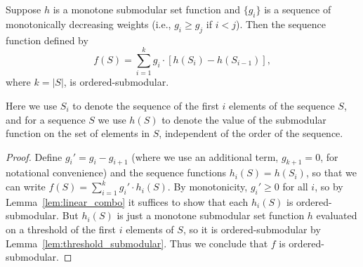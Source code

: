 \begin{lem} \label{lem:weighted_submodular}
Suppose $h$ is a monotone submodular set function and $\{g_i\}$ is a sequence of monotonically decreasing weights (i.e., $g_i \ge g_j$ if $i < j$). Then the sequence function defined by
$$f(S) = \sum_{i=1}^k g_i \cdot [ h(S_i) - h(S_{i-1}) ],$$ 
where $k = |S|$, is ordered-submodular. 
\end{lem}
Here we use $S_i$ to denote the sequence of the first $i$ elements of the sequence $S$, and for a sequence $S$ we use $h(S)$ to denote the value of the submodular function on the set of elements in $S$, independent of the order of the sequence.
\begin{proof}
Define $g_i' = g_i - g_{i+1}$ (where we use an additional term, $g_{k+1} = 0$, for notational convenience) and the sequence functions $h_i(S) = h(S_i)$, so that we can write $f(S) = \sum_{i=1}^k g_i' \cdot h_i(S)$. By monotonicity, $g_i' \ge 0$ for all $i$, so by Lemma~\ref{lem:linear_combo} it suffices to show that each $h_i(S)$ is ordered-submodular. But $h_i(S)$ is just a monotone submodular set function $h$ evaluated on a threshold of the first $i$ elements of $S$, so it is ordered-submodular by Lemma~\ref{lem:threshold_submodular}. Thus we conclude that $f$ is ordered-submodular.
\end{proof}




%